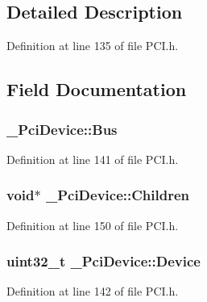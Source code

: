 \subsection{Detailed Description}


Definition at line 135 of file P\+C\+I.\+h.



\subsection{Field Documentation}
\subsubsection[{\texorpdfstring{Bus}{Bus}}]{ \+\_\+\+Pci\+Device\+::\+Bus}\hypertarget{struct__PciDevice_ac99e17b6dde217c76aeec72883f4d1e7}{}\label{struct__PciDevice_ac99e17b6dde217c76aeec72883f4d1e7}


Definition at line 141 of file P\+C\+I.\+h.

\subsubsection[{\texorpdfstring{Children}{Children}}]{\setlength{\rightskip}{0pt plus 5cm}void$\ast$ \+\_\+\+Pci\+Device\+::\+Children}\hypertarget{struct__PciDevice_adf56e308e389296a7a4612b048d906f7}{}\label{struct__PciDevice_adf56e308e389296a7a4612b048d906f7}


Definition at line 150 of file P\+C\+I.\+h.

\subsubsection[{\texorpdfstring{Device}{Device}}]{\setlength{\rightskip}{0pt plus 5cm}uint32\+\_\+t \+\_\+\+Pci\+Device\+::\+Device}\hypertarget{struct__PciDevice_abab1111099256cd120062a3c01d56f75}{}\label{struct__PciDevice_abab1111099256cd120062a3c01d56f75}


Definition at line 142 of file P\+C\+I.\+h.


